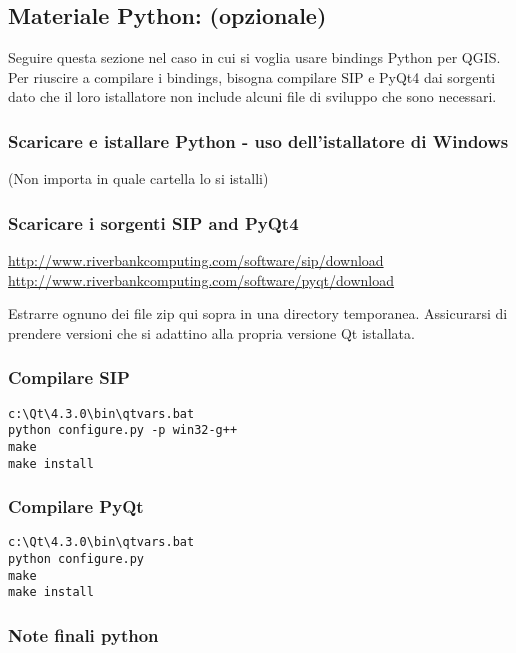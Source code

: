 \subsection{Materiale Python: (opzionale)}
Seguire questa sezione nel caso in cui si voglia usare bindings Python per QGIS.  Per riuscire a compilare i bindings, bisogna compilare SIP e PyQt4 dai sorgenti dato che il loro istallatore non include alcuni file di sviluppo che sono necessari.

\subsubsection{Scaricare e istallare Python - uso dell'istallatore di Windows}
(Non importa in quale cartella lo si istalli)


\subsubsection{Scaricare i sorgenti SIP and PyQt4}
\url{http://www.riverbankcomputing.com/software/sip/download} \\
\url{http://www.riverbankcomputing.com/software/pyqt/download}

Estrarre ognuno dei file zip qui sopra in una directory temporanea. Assicurarsi di prendere versioni che si adattino alla propria versione Qt istallata.

\subsubsection{Compilare SIP}
\begin{verbatim}
c:\Qt\4.3.0\bin\qtvars.bat 
python configure.py -p win32-g++ 
make 
make install 
\end{verbatim}

\subsubsection{Compilare PyQt}
\begin{verbatim}
c:\Qt\4.3.0\bin\qtvars.bat 
python configure.py 
make 
make install 
\end{verbatim}

\subsubsection{Note finali python}

